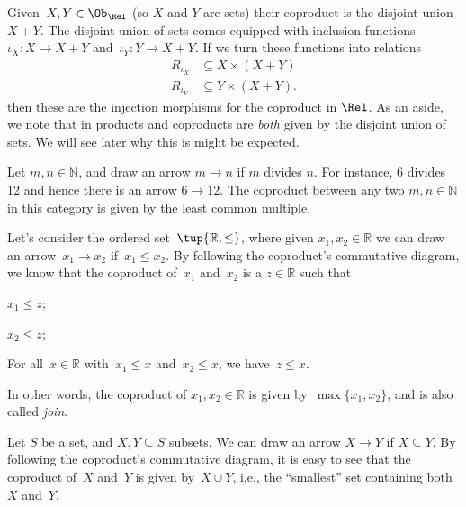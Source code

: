 \begin{example}
Given~$X,Y\in \Ob_\Rel$ (so $X$ and $Y$ are sets) their coproduct is the disjoint union~$X+Y$. The disjoint union of sets comes equipped with inclusion functions~$\iota_X\colon X\to X+Y$ and~$\iota_Y\colon Y\to X+Y$. If we turn these functions into relations
\begin{equation*}
\begin{aligned}
    R_{\iota_X}&\subseteq X\times (X+Y)\\
    R_{\iota_Y}&\subseteq Y\times (X+Y).
\end{aligned}
\end{equation*}
then these are the injection morphisms for the coproduct in $\Rel$. 
As an aside, we note that in \Rel products and coproducts are \emph{both} given by the disjoint union of sets. We will see later why this is might be expected. 
\end{example}

\begin{example}
Let $m,n\in \mathbb{N}$, and draw an arrow $m\to n$ if $m$ divides $n$. For instance, 6 divides 12 and hence there is an arrow $6\to 12$. The coproduct between any two $m,n\in \mathbb{N}$ in this category is given by the least common multiple. 
\end{example}

\begin{example}
Let's consider the ordered set~$\tup{\mathbb{R},\leq}$, where given $x_1,x_2\in \mathbb{R}$ we can draw an arrow~$x_1\to x_2$ if~$x_1\leq x_2$. By following the coproduct's commutative diagram, we know that the coproduct of~$x_1$ and~$x_2$ is a $z\in \mathbb{R}$ such that
\begin{compactitem}
\item $x_1\leq z$;
\item $x_2\leq z$;
\item For all~$x\in \mathbb{R}$ with~$x_1\leq x$ and~$x_2\leq x$, we have~$z\leq x$.
\end{compactitem}
In other words, the coproduct of $x_1,x_2\in \mathbb{R}$ is given by~$\max\{x_1,x_2\}$, and is also called \emph{join}.
\end{example}

\begin{example}
\label{ex:subset_coprod}
Let $S$ be a set, and $X,Y\subseteq S$ subsets. We can draw an arrow $X\to Y$ if $X\subseteq Y$. By following the coproduct's commutative diagram, it is easy to see that the coproduct of~$X$ and~$Y$ is given by~$X\cup Y$, i.e., the ``smallest'' set containing both~$X$ and~$Y$.
\end{example}

